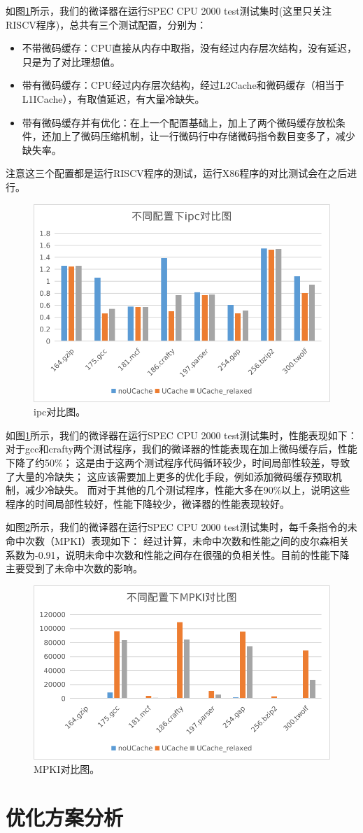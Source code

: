 如图\ref{img:ipc}所示，我们的微译器在运行SPEC CPU 2000 test测试集时(这里只关注RISCV程序)，总共有三个测试配置，分别为：
\begin{itemize}
  \item 不带微码缓存：CPU直接从内存中取指，没有经过内存层次结构，没有延迟，只是为了对比理想值。
  \item 带有微码缓存：CPU经过内存层次结构，经过L2Cache和微码缓存（相当于L1ICache），有取值延迟，有大量冷缺失。
  \item 带有微码缓存并有优化：在上一个配置基础上，加上了两个微码缓存放松条件，还加上了微码压缩机制，让一行微码行中存储微码指令数目变多了，减少缺失率。
\end{itemize}
注意这三个配置都是运行RISCV程序的测试，运行X86程序的对比测试会在之后进行。

\begin{figure}[!htbp]
  \centering
  \includegraphics[width=0.8\linewidth]{./plot_pdf/ipc.png}
  \caption{ipc对比图。}
  \label{img:ipc}
\end{figure}

如图\ref{img:ipc}所示，我们的微译器在运行SPEC CPU 2000 test测试集时，性能表现如下：
对于gcc和crafty两个测试程序，我们的微译器的性能表现在加上微码缓存后，性能下降了约50\%；
这是由于这两个测试程序代码循环较少，时间局部性较差，导致了大量的冷缺失；
这应该需要加上更多的优化手段，例如添加微码缓存预取机制，减少冷缺失。
而对于其他的几个测试程序，性能大多在90\%以上，说明这些程序的时间局部性较好，性能下降较少，微译器的性能表现较好。

如图\ref{img:MPKI}所示，我们的微译器在运行SPEC CPU 2000 test测试集时，每千条指令的未命中次数（MPKI）表现如下：
经过计算，未命中次数和性能之间的皮尔森相关系数为-0.91，说明未命中次数和性能之间存在很强的负相关性。目前的性能下降主要受到了未命中次数的影响。

\begin{figure}[!htbp]
  \centering
  \includegraphics[width=0.8\linewidth]{./plot_pdf/MPKI.png}
  \caption{MPKI对比图。}
  \label{img:MPKI}
\end{figure}

\section{优化方案分析}